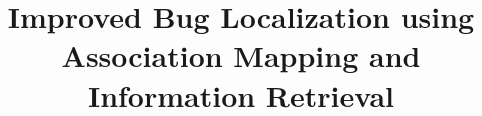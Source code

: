\documentclass[sigconf,review,anonymous]{acmart}
\begin{document}
%
\title{Improved Bug Localization using Association Mapping and Information Retrieval}

%
%
%
%
% 
%
%
%
%
\end{document}
